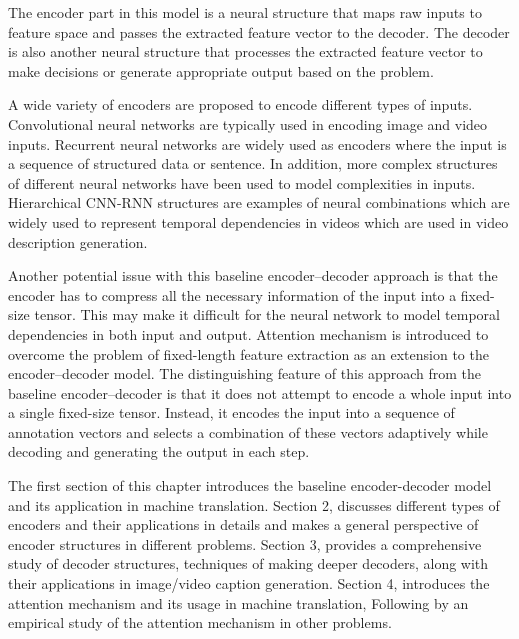\documentclass[preprint, 12pt]{elsarticle}
\begin{document}
	The encoder part in this model is a neural structure that maps raw inputs to feature space and passes the extracted feature vector to the decoder. The decoder is also another neural structure that processes the extracted feature vector to make decisions or generate appropriate output based on the problem.
	
	A wide variety of encoders are proposed to encode different types of inputs. Convolutional neural networks are typically used in encoding image and video inputs. Recurrent neural networks are widely used as encoders where the input is a sequence of structured data or sentence. In addition, more complex structures of different neural networks have been used to model complexities in inputs. Hierarchical CNN-RNN structures are examples of neural combinations which are widely used to represent temporal dependencies in videos which are used in video description generation.
	
	
	Another potential issue with this baseline encoder–decoder approach is that the encoder has to compress all the necessary information of the input into a fixed-size tensor. This may make it difficult for the neural network to model temporal dependencies in both input and output. Attention mechanism is introduced to overcome the problem of fixed-length feature extraction as an extension to the encoder–decoder model. The distinguishing feature of this approach from the baseline encoder–decoder is that it does not attempt to encode a whole input into a single fixed-size tensor. Instead, it encodes the input into a sequence of annotation vectors and selects a combination of these vectors adaptively while decoding and generating the output in each step.
	
	The first section of this chapter introduces the baseline encoder-decoder model and its application in machine translation. Section 2, discusses different types of encoders and their applications in details and makes a general perspective of encoder structures in different problems. Section 3, provides a comprehensive study of decoder structures, techniques of making deeper decoders, along with their applications in image/video caption generation. Section 4, introduces the attention mechanism and its usage in machine translation, Following by an empirical study of the attention mechanism in other problems.
	
\end{document}
